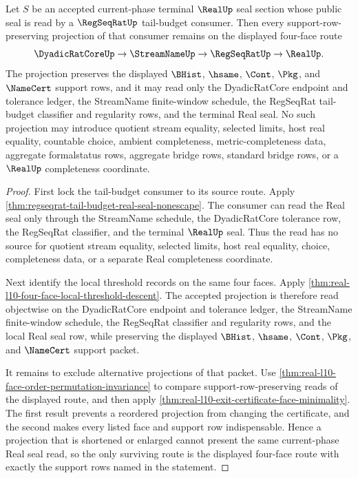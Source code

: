 \begin{theorem}
\label{thm:real-l10-tail-budget-projection-nonescape}
Let $S$ be an accepted current-phase terminal $\RealUp$ seal section whose public seal is read by a $\RegSeqRatUp$ tail-budget consumer. Then every support-row-preserving projection of that consumer remains on the displayed four-face route
$$
\DyadicRatCoreUp \to \StreamNameUp \to \RegSeqRatUp \to \RealUp .
$$
The projection preserves the displayed $\BHist$, $\hsame$, $\Cont$, $\Pkg$, and $\NameCert$ support rows, and it may read only the DyadicRatCore endpoint and tolerance ledger, the StreamName finite-window schedule, the RegSeqRat tail-budget classifier and regularity rows, and the terminal Real seal. No such projection may introduce quotient stream equality, selected limits, host real equality, countable choice, ambient completeness, metric-completeness data, aggregate formalstatus rows, aggregate bridge rows, standard bridge rows, or a $\RealUp$ completeness coordinate.
\end{theorem}
\begin{proof}
First lock the tail-budget consumer to its source route. Apply \autoref{thm:regseqrat-tail-budget-real-seal-nonescape}. The consumer can read the Real seal only through the StreamName schedule, the DyadicRatCore tolerance row, the RegSeqRat classifier, and the terminal $\RealUp$ seal. Thus the read has no source for quotient stream equality, selected limits, host real equality, choice, completeness data, or a separate Real completeness coordinate.

Next identify the local threshold records on the same four faces. Apply \autoref{thm:real-l10-four-face-local-threshold-descent}. The accepted projection is therefore read objectwise on the DyadicRatCore endpoint and tolerance ledger, the StreamName finite-window schedule, the RegSeqRat classifier and regularity rows, and the local Real seal row, while preserving the displayed $\BHist$, $\hsame$, $\Cont$, $\Pkg$, and $\NameCert$ support packet.

It remains to exclude alternative projections of that packet. Use \autoref{thm:real-l10-face-order-permutation-invariance} to compare support-row-preserving reads of the displayed route, and then apply \autoref{thm:real-l10-exit-certificate-face-minimality}. The first result prevents a reordered projection from changing the certificate, and the second makes every listed face and support row indispensable. Hence a projection that is shortened or enlarged cannot present the same current-phase Real seal read, so the only surviving route is the displayed four-face route with exactly the support rows named in the statement.
\end{proof}

